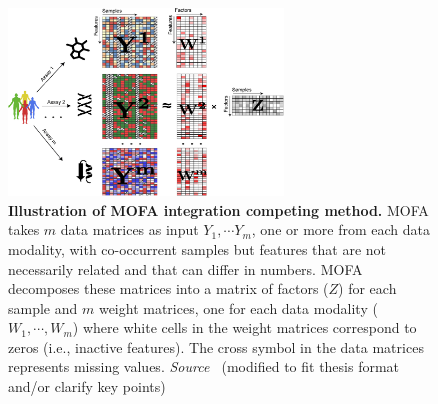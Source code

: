 \begin{itemize}
    
    \begin{figure}[!ht]
    	\centering
    	\includegraphics[width=0.65\textwidth]{Alg_MOFA/fig}
    	\vspace{0.1cm}
    	\caption[Illustration of MOFA integration competing method.]{\textbf{Illustration of MOFA integration competing method.} MOFA takes $m$ data matrices as input $Y_1, \cdots Y_m$, one or more from each data modality, with co-occurrent samples but features that are not necessarily related and that can differ in numbers. MOFA decomposes these matrices into a matrix of factors ($Z$) for each sample and $m$ weight matrices, one for each data modality ($W_1,\cdots, W_m$) where white cells in the weight matrices correspond to zeros (i.e., inactive features). The cross symbol in the data matrices represents missing values. \emph{Source ~\cite{tewari2017mofa}}(modified to fit thesis format and/or clarify key points) 
    }
    	\label{fig:Alg_MOFA}
    \end{figure}


\end{itemize}

